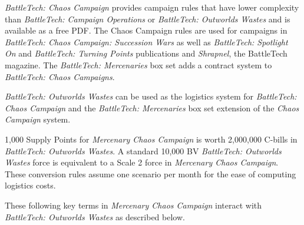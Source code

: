 \emph{BattleTech: Chaos Campaign} provides campaign rules that have lower complexity than \emph{BattleTech: Campaign Operations} or \emph{BattleTech: Outworlds Wastes} and is available as a free PDF.
The Chaos Campaign rules are used for campaigns in \emph{BattleTech: Chaos Campaign: Succession Wars} as well as \emph{BattleTech: Spotlight On} and \emph{BattleTech: Turning Points} publications and \emph{Shrapnel}, the BattleTech magazine.
The \emph{BattleTech: Mercenaries} box set adds a contract system to \emph{BattleTech: Chaos Campaigns}.

\emph{BattleTech: Outworlds Wastes} can be used as the logistics system for \emph{BattleTech: Chaos Campaign} and the \emph{BattleTech: Mercenaries} box set extension of the \emph{Chaos Campaign} system.

1,000 Supply Points for \emph{Mercenary Chaos Campaign} is worth 2,000,000 C-bills in \emph{BattleTech: Outworlds Wastes}.
A standard 10,000 BV \emph{BattleTech: Outworlds Wastes} force is equivalent to a Scale 2 force in \emph{Mercenary Chaos Campaign}.
These conversion rules assume one scenario per month for the ease of computing logistics costs.

These following key terms in \emph{Mercenary Chaos Campaign} interact with \emph{BattleTech: Outworlds Wastes} as described below.

